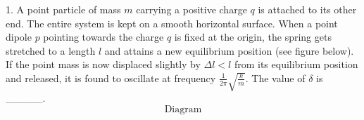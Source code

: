  1. A point particle of mass \(m\) carrying a positive charge \(q\) is attached to its other end. The entire system is kept on a smooth horizontal surface. When a point dipole \(p\) pointing towards the charge \(q\) is fixed at the origin, the spring gets stretched to a length \(l\) and attains a new equilibrium position (see figure below). If the point mass is now displaced slightly by \( \Delta l<l\) from its equilibrium position and released, it is found to oscillate at frequency \( \frac{1}{2\pi} \sqrt{\frac{k}{m}} \). The value of \(\delta \) is _____.
$$\text{Diagram}$$